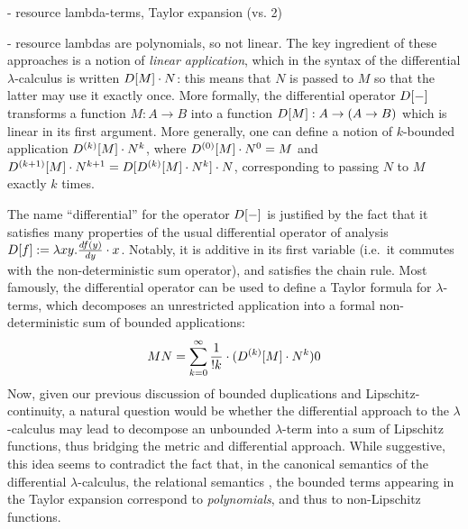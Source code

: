 - resource lambda-terms, Taylor expansion (vs. 2)

- resource lambdas are polynomials, so not linear. 
The key ingredient of these approaches is a notion of \emph{linear application}, which in the syntax of the differential $\lambda$-calculus is written $\Der[M]\cdot N$: this means that $N$ is passed to $M$ so that the latter may use it exactly once. More formally, the differential operator $\Der[-]$ transforms a function $M:A\to B$ into a function $\Der[M]: A\to (A\to B)$ which is linear in its first argument. 
More generally, one can define a notion of $k$-bounded application $\Der^{(k)}[M]\cdot N^{k}$, where $\Der^{(0)}[M]\cdot N^{0}= M$ and $\Der^{(k+1)}[M]\cdot N^{k+1}= \Der[ \Der^{(k)}[M]\cdot N^{k}]\cdot N$, corresponding to passing $N$ to $M$ exactly $k$ times.
%

The name ``differential'' for the operator $\Der[-]$ is justified by the fact that it satisfies many properties of the usual differential operator of analysis $\Der[f]:= \lambda xy. \frac{\mathsf df(y)}{\mathsf dy}\cdot x$. Notably, it is additive in its first variable (i.e.~it commutes with the non-deterministic sum operator), and satisfies the chain rule.
Most famously, the differential operator can be used to define a Taylor formula for $\lambda$-terms, which decomposes an unrestricted application into a formal non-deterministic sum of bounded applications:
\begin{align}
MN  =  \sum_{k=0}^{\infty}\frac{1}{!k}\cdot (\Der^{(k)}[M] \cdot N^{k})0
\end{align}
Now, given our previous discussion of bounded duplications and Lipschitz-continuity, a natural question would be whether the differential approach to the $\lambda$-calculus may lead to decompose an unbounded $\lambda$-term 
into a sum of Lipschitz functions, thus bridging the metric and differential approach.  
While suggestive, this idea seems to contradict the fact that, in the canonical semantics of the differential $\lambda$-calculus, the relational semantics \cite{}, the bounded terms appearing in the Taylor expansion correspond to \emph{polynomials}, and thus to non-Lipschitz functions. 


